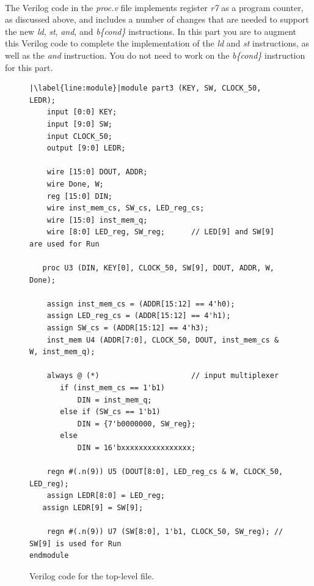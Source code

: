 \documentclass[epsfig,10pt,fullpage]{article}
\begin{document}
~\\
\noindent
The Verilog code in the {\it proc.v} file implements register {\it r7} as a program counter,
as discussed above, and includes a number of changes that are needed to support the 
new {\it ld}, {\it st}, {\it and}, and {\it b\{cond\}} instructions. In this part you are to 
augment this Verilog code to complete the implementation of the {\it ld} and
{\it st} instructions, as well as the {\it and} instruction. You do not 
need to work on the {\it b\{cond\}} instruction for this part. 

\lstset{language=Verilog,numbers=none,escapechar=|}
\begin{figure}[h]
\begin{center}
\begin{minipage}[h]{15 cm}
\begin{lstlisting}[name=proc]
|\label{line:module}|module part3 (KEY, SW, CLOCK_50, LEDR);
	input [0:0] KEY;
	input [9:0] SW;
	input CLOCK_50;
	output [9:0] LEDR;	

	wire [15:0] DOUT, ADDR;
	wire Done, W;
	reg [15:0] DIN;
	wire inst_mem_cs, SW_cs, LED_reg_cs;
	wire [15:0] inst_mem_q;
	wire [8:0] LED_reg, SW_reg;      // LED[9] and SW[9] are used for Run

   proc U3 (DIN, KEY[0], CLOCK_50, SW[9], DOUT, ADDR, W, Done);

	assign inst_mem_cs = (ADDR[15:12] == 4'h0);
	assign LED_reg_cs = (ADDR[15:12] == 4'h1);
	assign SW_cs = (ADDR[15:12] == 4'h3);
	inst_mem U4 (ADDR[7:0], CLOCK_50, DOUT, inst_mem_cs & W, inst_mem_q);

	always @ (*)                     // input multiplexer
	   if (inst_mem_cs == 1'b1)
		   DIN = inst_mem_q;
	   else if (SW_cs == 1'b1)
		   DIN = {7'b0000000, SW_reg};
	   else
		   DIN = 16'bxxxxxxxxxxxxxxxx;

	regn #(.n(9)) U5 (DOUT[8:0], LED_reg_cs & W, CLOCK_50, LED_reg);
	assign LEDR[8:0] = LED_reg;
   assign LEDR[9] = SW[9];

	regn #(.n(9)) U7 (SW[8:0], 1'b1, CLOCK_50, SW_reg); // SW[9] is used for Run
endmodule
\end{lstlisting}
\end{minipage}
\caption{Verilog code for the top-level file.}
\label{fig:top}
\end{center}
\end{figure}
\end{document}

